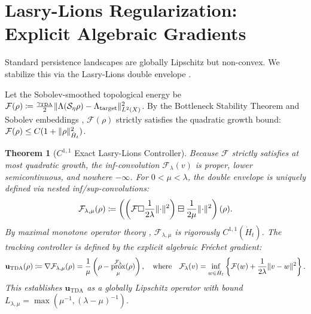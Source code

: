 \documentclass[11pt,a4paper]{article}
\DeclarePairedDelimiter{\norm}{\lVert}{\rVert}
\DeclareMathOperator{\prox}{prox}
\theoremstyle{plain}
\newtheorem{theorem}{Theorem}[section]
\theoremstyle{definition}
\theoremstyle{remark}
\begin{document}
\section{Lasry-Lions Regularization: Explicit Algebraic Gradients}
Standard persistence landscapes are globally Lipschitz but non-convex. We stabilize this via the Lasry-Lions double envelope \cite{Lasry1986, Bauschke2011}.

Let the Sobolev-smoothed topological energy be $\mathcal{F}(\rho) \coloneqq \frac{\gamma_{\mathrm{TDA}}}{2} \norm{\Lambda(\mathcal{S}_\eta \rho) - \Lambda_{\mathrm{target}}}_{L^2(X)}^2$. By the Bottleneck Stability Theorem and Sobolev embeddings \cite{Chazal2014, Adams2003}, $\mathcal{F}(\rho)$ strictly satisfies the quadratic growth bound: $\mathcal{F}(\rho) \le C(1 + \norm{\rho}_{\dot{H}_t}^2)$.

\begin{theorem}[$C^{1,1}$ Exact Lasry-Lions Controller]
Because $\mathcal{F}$ strictly satisfies at most quadratic growth, the inf-convolution $\mathcal{F}_\lambda(v)$ is proper, lower semicontinuous, and nowhere $-\infty$. For $0 < \mu < \lambda$, the double envelope is uniquely defined via nested inf/sup-convolutions:
\begin{equation}
    \mathcal{F}_{\lambda, \mu}(\rho) \coloneqq \left( \left( \mathcal{F} \Box \frac{1}{2\lambda}\norm{\cdot}^2 \right) \boxminus \frac{1}{2\mu}\norm{\cdot}^2 \right) (\rho).
\end{equation}
By maximal monotone operator theory \cite{Brezis1973}, $\mathcal{F}_{\lambda, \mu}$ is rigorously $C^{1,1}(\dot{H}_t)$. The tracking controller is defined by the explicit algebraic Fr\'{e}chet gradient:
\begin{equation}
    \mathbf{u}_{\mathrm{TDA}}(\rho) \coloneqq \nabla \mathcal{F}_{\lambda, \mu}(\rho) = \frac{1}{\mu} \left( \rho - \prox_{\mu}^{\mathcal{F}_\lambda}(\rho) \right), \quad \text{where} \quad \mathcal{F}_\lambda(v) = \inf_{w \in \dot{H}_t} \left\{ \mathcal{F}(w) + \frac{1}{2\lambda}\norm{v-w}^2 \right\}.
\end{equation}
This establishes $\mathbf{u}_{\mathrm{TDA}}$ as a globally Lipschitz operator with bound $L_{\lambda,\mu} = \max(\mu^{-1}, (\lambda-\mu)^{-1})$.
\end{theorem}

\end{document}

